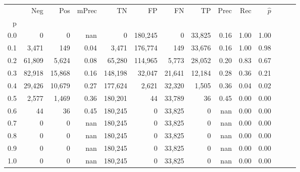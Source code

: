 \begin{tabular}{rrrrrrrrrrrrrr}
\toprule
{} &     Neg &     Pos & mPrec &       TN &       FP &      FN &      TP &  Prec &   Rec & $\hat{p}$ \\
p   &         &         &       &          &          &         &         &       &       &           \\
\midrule
0.0 &       0 &       0 &   nan &        0 &  180,245 &       0 &  33,825 &  0.16 &  1.00 &      1.00 \\
0.1 &   3,471 &     149 &  0.04 &    3,471 &  176,774 &     149 &  33,676 &  0.16 &  1.00 &      0.98 \\
0.2 &  61,809 &   5,624 &  0.08 &   65,280 &  114,965 &   5,773 &  28,052 &  0.20 &  0.83 &      0.67 \\
0.3 &  82,918 &  15,868 &  0.16 &  148,198 &   32,047 &  21,641 &  12,184 &  0.28 &  0.36 &      0.21 \\
0.4 &  29,426 &  10,679 &  0.27 &  177,624 &    2,621 &  32,320 &   1,505 &  0.36 &  0.04 &      0.02 \\
0.5 &   2,577 &   1,469 &  0.36 &  180,201 &       44 &  33,789 &      36 &  0.45 &  0.00 &      0.00 \\
0.6 &      44 &      36 &  0.45 &  180,245 &        0 &  33,825 &       0 &   nan &  0.00 &      0.00 \\
0.7 &       0 &       0 &   nan &  180,245 &        0 &  33,825 &       0 &   nan &  0.00 &      0.00 \\
0.8 &       0 &       0 &   nan &  180,245 &        0 &  33,825 &       0 &   nan &  0.00 &      0.00 \\
0.9 &       0 &       0 &   nan &  180,245 &        0 &  33,825 &       0 &   nan &  0.00 &      0.00 \\
1.0 &       0 &       0 &   nan &  180,245 &        0 &  33,825 &       0 &   nan &  0.00 &      0.00 \\
\bottomrule
\end{tabular}
